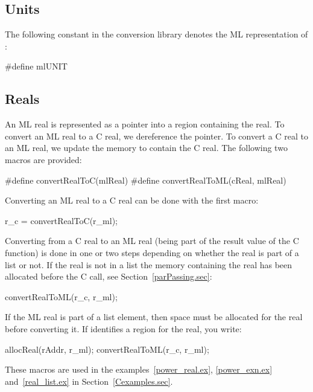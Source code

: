 \documentclass[12pt]{book}
\begin{document}
\subsection{Units}
The following constant in the conversion library denotes the ML representation
of \kw{()}:
%
%
%
\begin{scriptcode}
  #define mlUNIT
\end{scriptcode}

\subsection{Reals}
An ML real is represented as a pointer into a region containing the real. To
convert an ML real to a C real, we dereference the pointer. To convert a C real
to an ML real, we update the memory to contain the C real. The following two
macros are provided:
%
%
%
%
\begin{scriptcode}
  #define convertRealToC(mlReal)
  #define convertRealToML(cReal, mlReal)
\end{scriptcode}

Converting an ML real  to a C real  can be done with the
first macro:
\begin{scriptcode}
  r_c = convertRealToC(r_ml);
\end{scriptcode}

Converting from a C real to an ML real (being part of the result value of the C
function) is done in one or two steps depending on whether the real is part of a
list or not. If the real is not in a list the memory containing the real has
been allocated before the C call, see Section~\ref{parPassing.sec}:
\begin{scriptcode}
  convertRealToML(r_c, r_ml);
\end{scriptcode}
If the ML real is part of a list element, then space must be allocated for the
real before converting it. If  identifies a region for the real, you
write:
%
%
%
\begin{scriptcode}
  allocReal(rAddr, r_ml);
  convertRealToML(r_c, r_ml);
\end{scriptcode}

\noindent
These macros are used in the examples~\ref{power_real.ex}, \ref{power_exn.ex}
and~\ref{real_list.ex} in Section~\ref{Cexamples.sec}.
\end{document}
